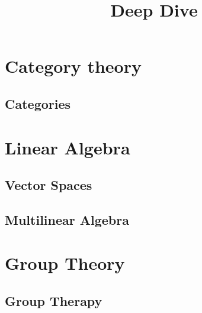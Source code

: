 

\title{Deep Dive}


\maketitle
\tableofcontents
\listoftodos

\part{Category theory}

\chapter{Categories}






\part{Linear Algebra}

\chapter{Vector Spaces}










\chapter{Multilinear Algebra}







\part{Group Theory}

\chapter{Group Therapy}

